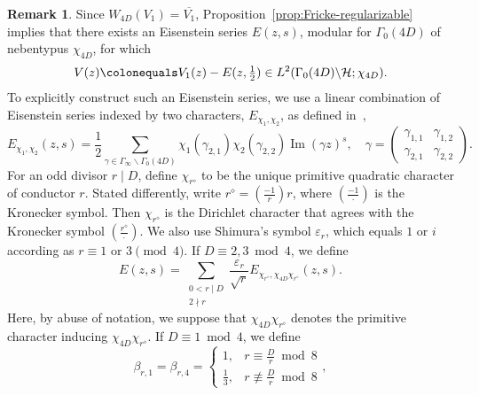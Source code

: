 \documentclass[11pt,reqno,oneside]{amsart}
\theoremstyle{plain}
\theoremstyle{definition}
\newtheorem{remark}[theorem]{Remark}
\renewcommand{\Im}{\operatorname{Im}}
\newcommand{\calH}{\mathcal{H}}
\newcommand{\chid}{\chi_{4D}}
\begin{document}
\begin{remark}\label{rem:explicit-regularization}
  Since $W_{4D}(V_1) = \overline{V_1}$, Proposition~\ref{prop:Fricke-regularizable} implies that there exists an Eisenstein series $E(z,s)$, modular for $\Gamma_0(4D)$ of nebentypus $\chid$, for which
  \begin{equation}
    V(z)
    \colonequals
    V_1(z) - E(z, \tfrac{1}{2})
    \in L^2(\Gamma_0(4D) \backslash \calH; \chid).
  \end{equation}
  To explicitly construct such an Eisenstein series, we use a linear combination of Eisenstein series indexed by two characters, $E_{\chi_1, \chi_2}$, as defined in~\cite{huxley0},
  \begin{equation}
    E_{\chi_1, \chi_2}(z,s)
    =
    \frac{1}{2} \sum_{\gamma \in \Gamma_{\infty} \backslash \Gamma_0(4D)}
    \chi_1(\gamma_{2,1}) \chi_2(\gamma_{2,2}) \Im (\gamma z)^s,
    \quad \gamma = \begin{pmatrix} \gamma_{1,1} & \gamma_{1,2} \\ \gamma_{2,1} &
                \gamma_{2,2}\end{pmatrix}.
  \end{equation}
  For an odd divisor $r \mid D$, define $\chi_{r^\diamond}$ to be the unique
  primitive quadratic character of conductor $r$.
  Stated differently, write $r^\diamond= (\frac{-1}{r}) r$, where
  $\left(\frac{-1}{\cdot}\right)$ is the Kronecker symbol.
  Then $\chi_{r^\diamond}$ is the Dirichlet character that agrees with the
  Kronecker symbol $\left(\frac{r^\diamond}{\cdot}\right)$.
  We also use Shimura's symbol $\varepsilon_r$, which equals $1$ or $i$ according as $r \equiv 1$ or $3 \pmod 4$.
  If $D \equiv 2, 3 \bmod 4$, we define
  \begin{equation}
    E(z,s)
    =
    \sum_{\substack{0< r \mid D \\ 2 \nmid r}}
    \frac{\varepsilon_r}{\sqrt{r}} E_{\chi_{r^\diamond}, \chid
        \chi_{r^{\diamond}}}(z,s).
  \end{equation}
  Here, by abuse of notation, we suppose that $\chid \chi_{r^\diamond}$ denotes the primitive character inducing $\chid \chi_{r^\diamond}$.
  If $D \equiv 1 \bmod 4$, we define
  \begin{equation}
    \beta_{r,1} = \beta_{r,4}
    = \begin{cases}
      1,           & r \equiv \frac{D}{r} \bmod 8      \\
      \frac{1}{3}, & r \not \equiv \frac{D}{r} \bmod 8
    \end{cases},

\end{equation}
\end{remark}
\end{document}
